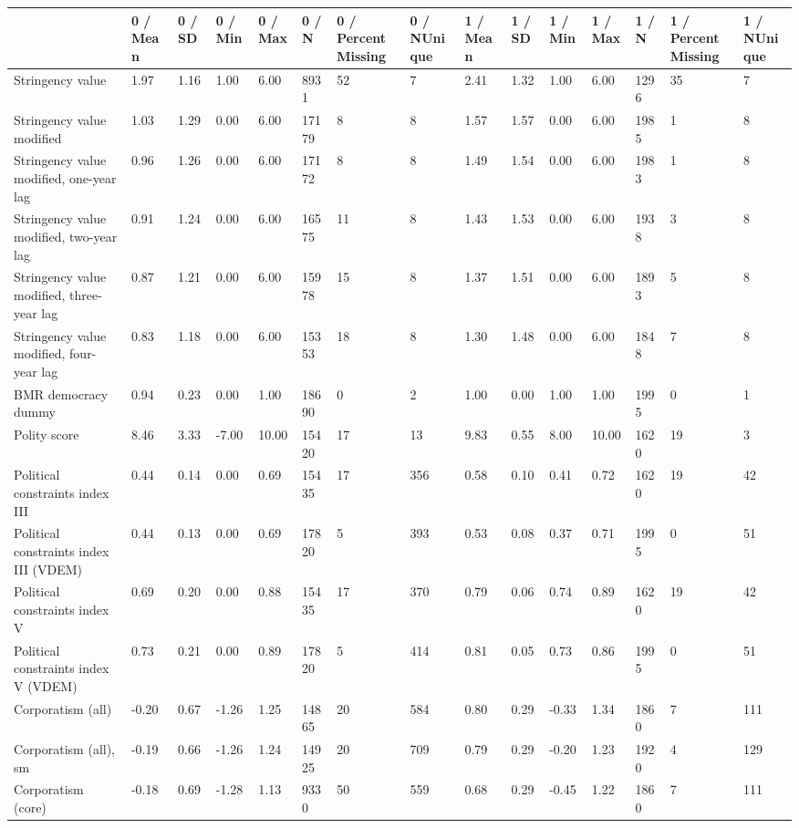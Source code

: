 
\begin{longtable}{lllllllllllllll}
\toprule
  & 0 / Mean & 0 / SD & 0 / Min & 0 / Max & 0 / N & 0 / PercentMissing & 0 / NUnique & 1 / Mean & 1 / SD & 1 / Min & 1 / Max & 1 / N & 1 / PercentMissing & 1 / NUnique\\
\midrule
Stringency value & 1.97 & 1.16 & 1.00 & 6.00 & 8931 & 52 & 7 & 2.41 & 1.32 & 1.00 & 6.00 & 1296 & 35 & 7\\
Stringency value modified & 1.03 & 1.29 & 0.00 & 6.00 & 17179 & 8 & 8 & 1.57 & 1.57 & 0.00 & 6.00 & 1985 & 1 & 8\\
Stringency value modified, one-year lag & 0.96 & 1.26 & 0.00 & 6.00 & 17172 & 8 & 8 & 1.49 & 1.54 & 0.00 & 6.00 & 1983 & 1 & 8\\
Stringency value modified, two-year lag & 0.91 & 1.24 & 0.00 & 6.00 & 16575 & 11 & 8 & 1.43 & 1.53 & 0.00 & 6.00 & 1938 & 3 & 8\\
Stringency value modified, three-year lag & 0.87 & 1.21 & 0.00 & 6.00 & 15978 & 15 & 8 & 1.37 & 1.51 & 0.00 & 6.00 & 1893 & 5 & 8\\
\addlinespace
Stringency value modified, four-year lag & 0.83 & 1.18 & 0.00 & 6.00 & 15353 & 18 & 8 & 1.30 & 1.48 & 0.00 & 6.00 & 1848 & 7 & 8\\
BMR democracy dummy & 0.94 & 0.23 & 0.00 & 1.00 & 18690 & 0 & 2 & 1.00 & 0.00 & 1.00 & 1.00 & 1995 & 0 & 1\\
Polity score & 8.46 & 3.33 & -7.00 & 10.00 & 15420 & 17 & 13 & 9.83 & 0.55 & 8.00 & 10.00 & 1620 & 19 & 3\\
Political constraints index III & 0.44 & 0.14 & 0.00 & 0.69 & 15435 & 17 & 356 & 0.58 & 0.10 & 0.41 & 0.72 & 1620 & 19 & 42\\
Political constraints index III (VDEM) & 0.44 & 0.13 & 0.00 & 0.69 & 17820 & 5 & 393 & 0.53 & 0.08 & 0.37 & 0.71 & 1995 & 0 & 51\\
\addlinespace
Political constraints index V & 0.69 & 0.20 & 0.00 & 0.88 & 15435 & 17 & 370 & 0.79 & 0.06 & 0.74 & 0.89 & 1620 & 19 & 42\\
Political constraints index V (VDEM) & 0.73 & 0.21 & 0.00 & 0.89 & 17820 & 5 & 414 & 0.81 & 0.05 & 0.73 & 0.86 & 1995 & 0 & 51\\
Corporatism (all) & -0.20 & 0.67 & -1.26 & 1.25 & 14865 & 20 & 584 & 0.80 & 0.29 & -0.33 & 1.34 & 1860 & 7 & 111\\
Corporatism (all), sm & -0.19 & 0.66 & -1.26 & 1.24 & 14925 & 20 & 709 & 0.79 & 0.29 & -0.20 & 1.23 & 1920 & 4 & 129\\
Corporatism (core) & -0.18 & 0.69 & -1.28 & 1.13 & 9330 & 50 & 559 & 0.68 & 0.29 & -0.45 & 1.22 & 1860 & 7 & 111\\

\end{longtable}
